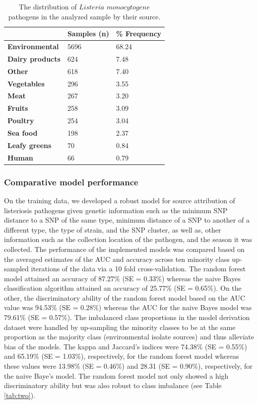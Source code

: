 \documentclass[
  10pt,
]{article}
\begin{document}
\begin{table}[H]

\caption{\label{tab:one}The distribution of $\textit{Listeria monocytogene}$ pathogens in the analyzed sample by their source.}
\centering
\begin{tabular}[t]{>{}l|l|l}
\hline
\textbf{ } & \textbf{Samples (n)} & \textbf{\% Frequency}\\
\hline
\textbf{Environmental} & 5696 & 68.24\\
\hline
\textbf{Dairy products} & 624 & 7.48\\
\hline
\textbf{Other} & 618 & 7.40\\
\hline
\textbf{Vegetables} & 296 & 3.55\\
\hline
\textbf{Meat} & 267 & 3.20\\
\hline
\textbf{Fruits} & 258 & 3.09\\
\hline
\textbf{Poultry} & 254 & 3.04\\
\hline
\textbf{Sea food} & 198 & 2.37\\
\hline
\textbf{Leafy greens} & 70 & 0.84\\
\hline
\textbf{Human} & 66 & 0.79\\
\hline
\end{tabular}
\end{table}

\hypertarget{comparative-model-performance}{%
\subsubsection{Comparative model performance}\label{comparative-model-performance}}

On the training data, we developed a robust model for source attribution of listeriosis pathogens given genetic information such as the minimum SNP distance to a SNP of the same type, minimum distance of a SNP to another of a different type, the type of strain, and the SNP cluster, as well as, other information such as the collection location of the pathogen, and the season it was collected. The performance of the implemented models was compared based on the averaged estimates of the AUC and accuracy across ten minority class up-sampled iterations of the data via a 10 fold cross-validation. The random forest model attained an accuracy of 87.27\% (SE = 0.33\%) whereas the naive Bayes classification algorithm attained an accuracy of 25.77\% (SE = 0.65\%). On the other, the discriminatory ability of the random forest model based on the AUC value was 94.53\% (SE = 0.28\%) whereas the AUC for the naive Bayes model was 79.61\% (SE = 0.57\%). The imbalanced class proportions in the model derivation dataset were handled by up-sampling the minority classes to be at the same proportion as the majority class (environmental isolate sources) and thus alleviate bias of the models. The kappa and Jaccard's indices were 74.38\% (SE = 0.55\%) and 65.19\% (SE = 1.03\%), respectively, for the random forest model whereas these values were 13.98\% (SE = 0.46\%) and 28.31 (SE = 0.90\%), respectively, for the naive Baye's model. The random forest model not only showed a high discriminatory ability but was also robust to class imbalance (see Table \ref{tab:two}).
\end{document}
